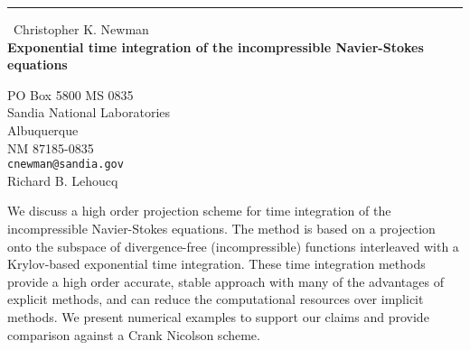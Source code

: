 \documentclass{report}
\begin{document}
\begin{center}
\rule{6in}{1pt} \
{\large Christopher K. Newman \\
{\bf Exponential time integration of the incompressible Navier-Stokes equations}}

PO Box 5800 MS 0835 \\ Sandia National Laboratories \\ Albuquerque \\ NM 87185-0835
\\
{\tt cnewman@sandia.gov}\\
Richard B. Lehoucq\end{center}

We discuss a high order projection scheme for time integration
of the incompressible Navier-Stokes equations.
The method is based on a projection onto the subspace of
divergence-free (incompressible) functions interleaved with
a Krylov-based exponential time integration.
These time integration methods provide a high order accurate,
stable approach with many of the advantages of explicit methods,
and can reduce the computational resources over implicit methods.
We present numerical examples to support our claims and provide
comparison against a Crank Nicolson scheme.
\end{document}
